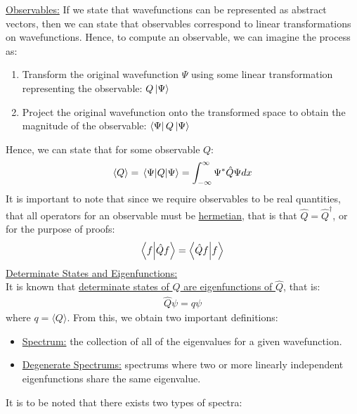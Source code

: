 \documentclass{article}
\newcommand{\gap}{\medskip\\}
\newcommand{\sheader}[1]{\underline{#1:}}
\begin{document}
    \sheader{Observables}
    If we state that wavefunctions can be represented as abstract vectors, then 
    we can state that observables correspond to linear transformations on wavefunctions.
    Hence, to compute an observable, we can imagine the process as:
    \begin{enumerate}
        \item Transform the original wavefunction $\Psi$ using some linear transformation
        representing the observable: $Q\ket{\Psi}$
        \item Project the original wavefunction onto the transformed space to obtain 
        the magnitude of the observable: $\bra{\Psi} Q \ket{\Psi}$
    \end{enumerate}
    Hence, we can state that for some observable $Q$: 
    \begin{align*}
        \langle Q \rangle = \expval{Q}{\Psi} = \int_{-\infty}^\infty \Psi^* \hat{Q} \Psi dx
    \end{align*}
    It is important to note that since we require observables to be real quantities, 
    that all operators for an observable must be \underline{hermetian}, that is that 
    $\hat{Q} = \hat{Q}^\dagger$, or for the purpose of proofs:
    \begin{align*}
        \braket{f}{\hat{Q} f} = \braket{\hat{Q} f}{f}
    \end{align*}
    \sheader{Determinate States and Eigenfunctions}
    \gap 
    It is known that \underline{determinate states of $Q$ are eigenfunctions of $\hat{Q}$}, that is:
    \begin{align*}
        \hat{Q}\psi = q \psi
    \end{align*}
    where $q = \langle Q \rangle$.
    From this, we obtain two important definitions:
    \begin{itemize}
        \item \sheader{Spectrum} the collection of all of the eigenvalues for a given wavefunction.
        \item \sheader{Degenerate Spectrums} spectrums where two or more linearly independent 
        eigenfunctions share the same eigenvalue.  
    \end{itemize}
    It is to be noted that there exists two types of spectra:
\end{document}
